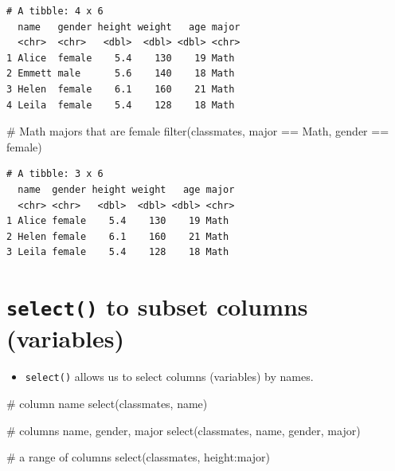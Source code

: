 \documentclass[
  letterpaper,
  DIV=11,
  numbers=noendperiod]{scrreprt}
\newenvironment{Shaded}{\begin{snugshade}}{\end{snugshade}}
\newcommand{\CommentTok}[1]{\textcolor[rgb]{0.37,0.37,0.37}{#1}}
\newcommand{\FunctionTok}[1]{\textcolor[rgb]{0.28,0.35,0.67}{#1}}
\newcommand{\NormalTok}[1]{\textcolor[rgb]{0.00,0.23,0.31}{#1}}
\newcommand{\SpecialCharTok}[1]{\textcolor[rgb]{0.37,0.37,0.37}{#1}}
\newcommand{\StringTok}[1]{\textcolor[rgb]{0.13,0.47,0.30}{#1}}
\providecommand{\tightlist}{%
  \setlength{\itemsep}{0pt}\setlength{\parskip}{0pt}}\usepackage{longtable,booktabs,array}
\begin{document}
\begin{tcolorbox}
\begin{verbatim}
# A tibble: 4 x 6
  name   gender height weight   age major
  <chr>  <chr>   <dbl>  <dbl> <dbl> <chr>
1 Alice  female    5.4    130    19 Math 
2 Emmett male      5.6    140    18 Math 
3 Helen  female    6.1    160    21 Math 
4 Leila  female    5.4    128    18 Math 
\end{verbatim}

\begin{Shaded}
\begin{Highlighting}[]
\CommentTok{\# Math majors that are female}
\FunctionTok{filter}\NormalTok{(classmates, major }\SpecialCharTok{==} \StringTok{\textquotesingle{}Math\textquotesingle{}}\NormalTok{, gender }\SpecialCharTok{==} \StringTok{\textquotesingle{}female\textquotesingle{}}\NormalTok{)}
\end{Highlighting}
\end{Shaded}

\begin{verbatim}
# A tibble: 3 x 6
  name  gender height weight   age major
  <chr> <chr>   <dbl>  <dbl> <dbl> <chr>
1 Alice female    5.4    130    19 Math 
2 Helen female    6.1    160    21 Math 
3 Leila female    5.4    128    18 Math 
\end{verbatim}

\end{tcolorbox}

\section{\texorpdfstring{\texttt{select()} to subset columns
(variables)}{select() to subset columns (variables)}}\label{select-to-subset-columns-variables}

\begin{itemize}
\tightlist
\item
  \texttt{select()} allows us to select columns (variables) by names.
\end{itemize}

\begin{Shaded}
\begin{Highlighting}[]
\CommentTok{\# column name}
\FunctionTok{select}\NormalTok{(classmates, name)}

\CommentTok{\# columns name, gender, major}
\FunctionTok{select}\NormalTok{(classmates, name, gender, major)}

\CommentTok{\# a range of columns}
\FunctionTok{select}\NormalTok{(classmates, height}\SpecialCharTok{:}\NormalTok{major)}
\end{Highlighting}
\end{Shaded}
\end{document}
